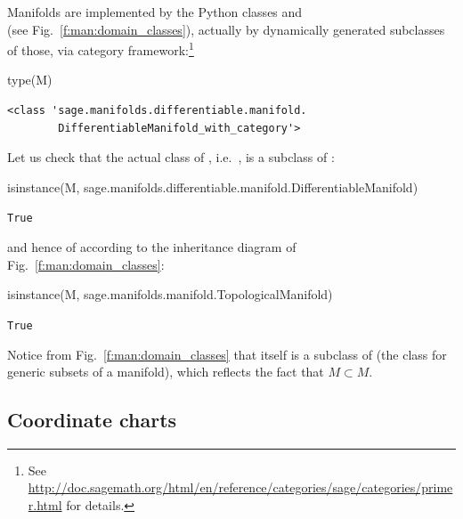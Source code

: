 Manifolds are implemented by the Python classes 
and \\  (see Fig.~\ref{f:man:domain_classes}),
actually by dynamically generated subclasses of those, via \Sage{} category
framework:\footnote{See \url{http://doc.sagemath.org/html/en/reference/categories/sage/categories/primer.html} for details.}
\begin{NBin}
type(M)
\end{NBin}
\begin{NBout}
\begin{verbatim}
<class 'sage.manifolds.differentiable.manifold.
        DifferentiableManifold_with_category'>
\end{verbatim}
\end{NBout}
Let us check that the actual class of , i.e.\ ,
is a subclass of :
\begin{NBin}
isinstance(M,
           sage.manifolds.differentiable.manifold.DifferentiableManifold)
\end{NBin}
\begin{NBout}
\texttt{True}
\end{NBout}
and hence of
 according to the inheritance diagram of Fig.~\ref{f:man:domain_classes}:
\begin{NBin}
isinstance(M, sage.manifolds.manifold.TopologicalManifold)
\end{NBin}
\begin{NBout}
\texttt{True}
\end{NBout}
Notice from Fig.~\ref{f:man:domain_classes} that
 itself is a subclass of  (the class
for generic subsets of a manifold), which reflects the fact that $M\subset M$.

\subsection{Coordinate charts} \label{s:man:coord_chart}

